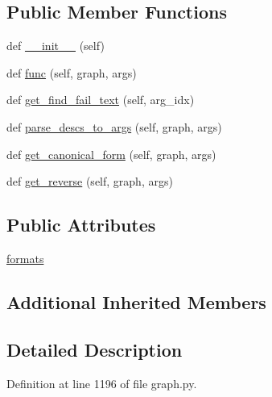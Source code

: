 \subsection*{Public Member Functions}
\begin{DoxyCompactItemize}
\item 
def \hyperlink{classlight__chats_1_1graph_1_1GetObjectFunction_a77ef8fd9dd23fae23a1cb61fb0ebeca1}{\+\_\+\+\_\+init\+\_\+\+\_\+} (self)
\item 
def \hyperlink{classlight__chats_1_1graph_1_1GetObjectFunction_a36f3c298e8ac89d67ae856306d42a22d}{func} (self, graph, args)
\item 
def \hyperlink{classlight__chats_1_1graph_1_1GetObjectFunction_a257db456e6c73645523f4ad9bd5ff918}{get\+\_\+find\+\_\+fail\+\_\+text} (self, arg\+\_\+idx)
\item 
def \hyperlink{classlight__chats_1_1graph_1_1GetObjectFunction_a2854af16c5150dcd6a39176fefc3d536}{parse\+\_\+descs\+\_\+to\+\_\+args} (self, graph, args)
\item 
def \hyperlink{classlight__chats_1_1graph_1_1GetObjectFunction_a95528a5a8694228805bad940519e6e0e}{get\+\_\+canonical\+\_\+form} (self, graph, args)
\item 
def \hyperlink{classlight__chats_1_1graph_1_1GetObjectFunction_abf058d18fba80c7d17fc0d3ce8edbc72}{get\+\_\+reverse} (self, graph, args)
\end{DoxyCompactItemize}
\subsection*{Public Attributes}
\begin{DoxyCompactItemize}
\item 
\hyperlink{classlight__chats_1_1graph_1_1GetObjectFunction_a726f8b3315bfedc530da445bb3e135e6}{formats}
\end{DoxyCompactItemize}
\subsection*{Additional Inherited Members}


\subsection{Detailed Description}
\begin{DoxyVerb}
\end{DoxyVerb}
 

Definition at line 1196 of file graph.\+py.



